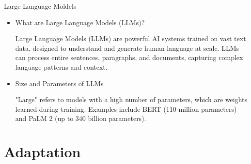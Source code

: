 \documentclass[serif, aspectratio=169]{beamer}
\begin{document}
\begin{frame}{Large Language Moldels}
    \begin{itemize}
        \item  
            \large{What are Large Language Models (LLMs)?}
            \vspace{0.5cm}
            \begin{outline}
                \1 Large Language Models (LLMs) are powerful AI systems trained on vast text data, designed to understand and generate human language at scale.
                \vspace{0.2cm}
                \1 LLMs can process entire sentences, paragraphs, and documents, capturing complex language patterns and context.
            \end{outline}
            \vspace{0.3cm}
        \item 
            \large{Size and Parameters of LLMs}
            \vspace{0.5cm}
            \begin{outline}
                \1 "Large" refers to models with a high number of parameters, which are weights learned during training. 
                \2 Examples include BERT (110 million parameters) and PaLM 2 (up to 340 billion parameters).
            \end{outline}
    \end{itemize}
    
\end{frame}

\section{Adaptation}
\end{document}

